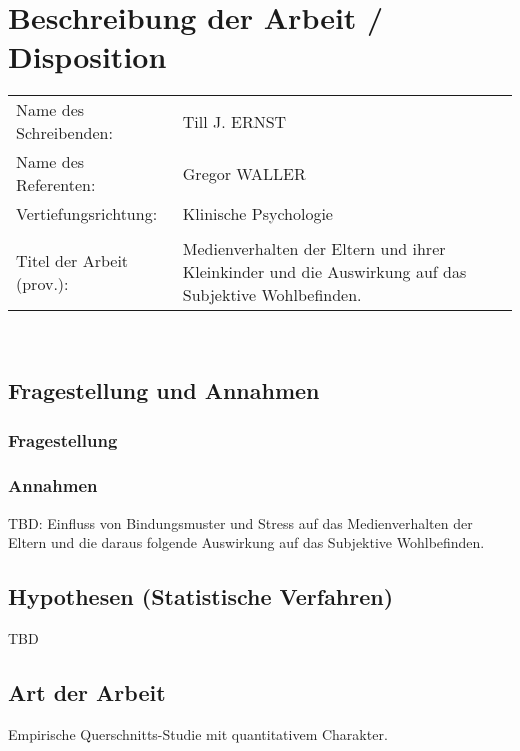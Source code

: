 \section{Beschreibung der Arbeit / Disposition}
\hspace{-0.9cm} %
\begin{tabular}{p{} p{10cm}} 
Name des Schreibenden: & Till J. ERNST \\ 
Name des Referenten: & Gregor WALLER \\
Vertiefungsrichtung: & Klinische Psychologie \\
& \\
Titel der Arbeit (prov.): & Medienverhalten der Eltern und ihrer Kleinkinder und die Auswirkung auf das Subjektive Wohlbefinden.\\
\end{tabular} \\
\subsection{Fragestellung und Annahmen}
\subsubsection{Fragestellung}
\subsubsection{Annahmen}
TBD: Einfluss von Bindungsmuster und Stress auf das Medienverhalten der Eltern und die daraus folgende Auswirkung auf das Subjektive Wohlbefinden.
\subsection{Hypothesen (Statistische Verfahren)}
TBD
\subsection{Art der Arbeit}
Empirische Querschnitts-Studie mit quantitativem Charakter.
